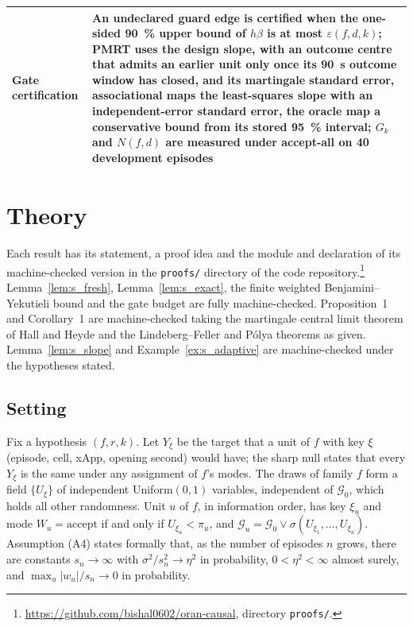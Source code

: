 \documentclass[pdflatex,sn-mathphys-num]{sn-jnl}%
\theoremstyle{thmstyleone}%
\theoremstyle{thmstyletwo}%
\theoremstyle{thmstylethree}%
\begin{document}
\begin{table}
\begin{tabular*}{\textwidth}{@{\extracolsep{\fill}}>{\raggedright}p{}>{\raggedright\arraybackslash}p{}@{}}
Gate certification & An undeclared guard edge is certified when the one-sided 90~\% upper bound of $h\beta$ is at most $\varepsilon(f, d, k)$; PMRT uses the design slope, with an outcome centre that admits an earlier unit only once its 90~s outcome window has closed, and its martingale standard error, associational maps the least-squares slope with an independent-error standard error, the oracle map a conservative bound from its stored 95~\% interval; $G_k$ and $N(f, d)$ are measured under accept-all on 40 development episodes \\
\bottomrule
\end{tabular*}
\end{table}

\FloatBarrier
\section{Theory}
\label{esm:theory}

Each result has its statement, a proof idea and the module and declaration of its machine-checked version in the
\texttt{proofs/} directory of the code repository.\footnote{\url{https://github.com/bishal0602/oran-causal}, directory \texttt{proofs/}.}
Lemma~\ref{lem:s_fresh}, Lemma~\ref{lem:s_exact}, the finite weighted Benjamini--Yekutieli bound and the gate budget are
fully machine-checked. Proposition~1 and Corollary~1 are machine-checked taking the martingale central limit theorem
of Hall and Heyde and the Lindeberg--Feller and P\'olya theorems as given. Lemma~\ref{lem:s_slope} and
Example~\ref{ex:s_adaptive} are machine-checked under the hypotheses stated.

\subsection{Setting}
\label{esm:setting}

Fix a hypothesis $(f, r, k)$. Let $Y_\xi$ be the target that a unit of $f$ with key $\xi$ (episode, cell, xApp, opening
second) would have; the sharp null states that every $Y_\xi$ is the same under any assignment of $f$'s modes. The draws
of family $f$ form a field $\{U_\xi\}$ of independent Uniform$(0, 1)$ variables, independent of $\mathcal{G}_0$, which
holds all other randomness. Unit $u$ of $f$, in information order, has key $\xi_u$ and mode
$W_u = \text{accept}$ if and only if $U_{\xi_u} < \pi_u$, and
$\mathcal{G}_u = \mathcal{G}_0 \vee \sigma(U_{\xi_1}, \dots, U_{\xi_u})$. Assumption (A4) states formally that, as the
number of episodes $n$ grows, there are constants $s_n \to \infty$ with $\sigma^2 / s_n^2 \to \eta^2$ in probability,
$0 < \eta^2 < \infty$ almost surely, and $\max_u |w_u| / s_n \to 0$ in probability.
\end{document}
